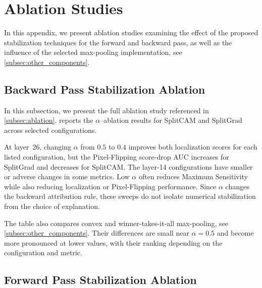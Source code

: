 \section{Ablation Studies}
\label{app:ablation}

In this appendix, we present ablation studies examining the effect of the proposed stabilization techniques for the forward and backward pass, as well as the influence of the selected max-pooling implementation, see \cref{subsec:other_components}.

\subsection{Backward Pass Stabilization Ablation}



In this subsection, we present the full ablation study referenced in \cref{subsec:ablation}. 
 reports the $\alpha$--ablation results for SplitCAM 
and SplitGrad across selected configurations.

At layer~26, changing $\alpha$ from $0.5$ to $0.4$ improves both localization scores for each
listed configuration, but the Pixel-Flipping score-drop AUC increases for SplitGrad and decreases
for SplitCAM. The layer-14 configurations have smaller or adverse changes in some metrics. Low
$\alpha$ often reduces Maximum Sensitivity while also reducing localization or Pixel-Flipping
performance. Since $\alpha$ changes the backward attribution rule, these sweeps do not isolate
numerical stabilization from the choice of explanation.

The table also compares convex and winner-takes-it-all max-pooling, see
\cref{subsec:other_components}. Their differences are small near $\alpha=0.5$ and become more
pronounced at lower values, with their ranking depending on the configuration and metric.

\subsection{Forward Pass Stabilization Ablation}

